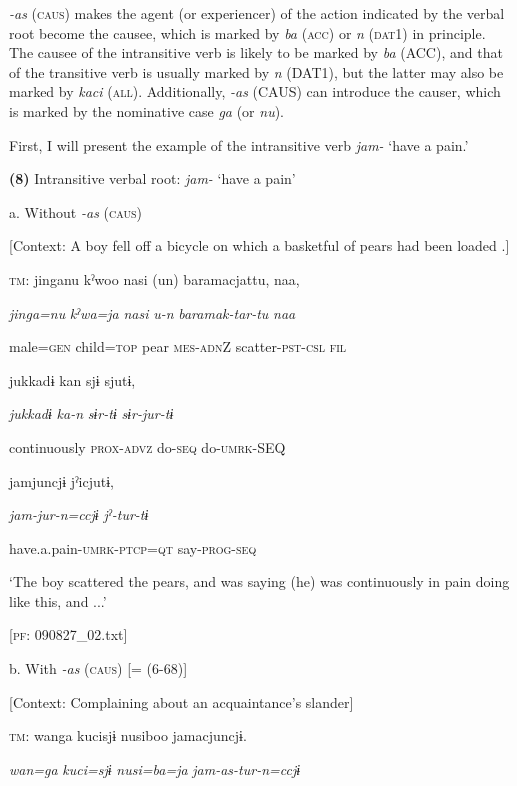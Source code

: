 \textit{{}-as} (\textsc{caus}) makes the agent (or experiencer) of the action indicated by the verbal root become the causee, which is marked by \textit{ba} (\textsc{acc}) or \textit{n} (\textsc{dat}1) in principle. The causee of the intransitive verb is likely to be marked by \textit{ba} (ACC), and that of the transitive verb is usually marked by \textit{n} (DAT1), but the latter may also be marked by \textit{kaci} (\textsc{all}). Additionally, \textit{{}-as} (CAUS) can introduce the causer, which is marked by the nominative case \textit{ga} (or \textit{nu}).

  First, I will present the example of the intransitive verb \textit{jam-} ‘have a pain.’

\textbf{(8)}  Intransitive verbal root: \textit{jam-} ‘have a pain’

  a. Without \textit{-as} (\textsc{caus})

  [Context: A boy fell off a bicycle on which a basketful of pears had been loaded .]

  \textsc{tm}:  jinganu  kˀwoo  nasi  (un)  baramacjattu,  naa,

    \textit{jinga=nu}  \textit{kˀwa=ja}  \textit{nasi}  \textit{u-n}  \textit{baramak-tar-tu}  \textit{naa}

    male=\textsc{gen}  child=\textsc{top}  pear  \textsc{mes}-\textsc{adn}Z  scatter-\textsc{pst}-\textsc{csl}  \textsc{fil}

    jukkadɨ  kan  sjɨ  sjutɨ,

    \textit{jukkadɨ}  \textit{ka-n}  \textit{sɨr-tɨ}  \textit{sɨr-jur-tɨ}

    continuously  \textsc{prox}-\textsc{advz}  do-\textsc{seq}  do-\textsc{umrk}-SEQ

    jamjuncjɨ  jˀicjutɨ,

    \textit{jam{}-jur-n=ccjɨ  jˀ-tur-tɨ}

    have.a.pain-\textsc{umrk}-\textsc{ptcp}=\textsc{qt}  say-\textsc{prog}-\textsc{seq}

    ‘The boy scattered the pears, and was saying (he) was continuously in pain doing like this, and ...’

    [\textsc{pf}: 090827\_02.txt]

  b. With \textit{-as} (\textsc{caus}) [= (6-68)]

  [Context: Complaining about an acquaintance’s slander]

  \textsc{tm}:  wanga  kucisjɨ  nusiboo  jamacjuncjɨ.

    \textit{wan=ga}  \textit{kuci=sjɨ}  \textit{nusi=ba=ja}  \textit{jam-as{}-tur-n=ccjɨ}

